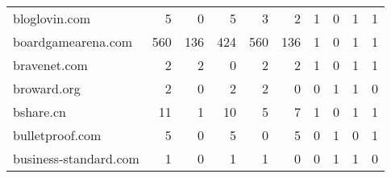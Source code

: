 \begin{tabular}{lrrrrrrrrr}
              bloglovin.com &                                5 &                                  0 &                                      5 &                            3 &                           2 &                                   1 &                                      0 &                             1 &                            1 \\
         boardgamearena.com &                              560 &                                136 &                                    424 &                          560 &                         136 &                                   1 &                                      0 &                             1 &                            1 \\
               bravenet.com &                                2 &                                  2 &                                      0 &                            2 &                           2 &                                   1 &                                      0 &                             1 &                            1 \\
                broward.org &                                2 &                                  0 &                                      2 &                            2 &                           0 &                                   0 &                                      1 &                             1 &                            0 \\
                  bshare.cn &                               11 &                                  1 &                                     10 &                            5 &                           7 &                                   1 &                                      0 &                             1 &                            1 \\
            bulletproof.com &                                5 &                                  0 &                                      5 &                            0 &                           5 &                                   0 &                                      1 &                             0 &                            1 \\
      business-standard.com &                                1 &                                  0 &                                      1 &                            1 &                           0 &                                   0 &                                      1 &                             1 &                            0 \\

\end{tabular}
